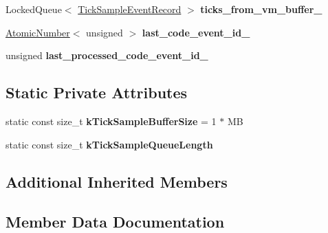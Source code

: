 \begin{DoxyCompactItemize}
\item 
Locked\+Queue$<$ \hyperlink{classv8_1_1internal_1_1_tick_sample_event_record}{Tick\+Sample\+Event\+Record} $>$ {\bfseries ticks\+\_\+from\+\_\+vm\+\_\+buffer\+\_\+}\hypertarget{classv8_1_1internal_1_1_profiler_events_processor_ab7618f01a46fb423db580f06e65baeb9}{}\label{classv8_1_1internal_1_1_profiler_events_processor_ab7618f01a46fb423db580f06e65baeb9}

\item 
\hyperlink{classv8_1_1internal_1_1_atomic_number}{Atomic\+Number}$<$ unsigned $>$ {\bfseries last\+\_\+code\+\_\+event\+\_\+id\+\_\+}\hypertarget{classv8_1_1internal_1_1_profiler_events_processor_a5006cc5f9e17cea97ca344e9b14715a1}{}\label{classv8_1_1internal_1_1_profiler_events_processor_a5006cc5f9e17cea97ca344e9b14715a1}

\item 
unsigned {\bfseries last\+\_\+processed\+\_\+code\+\_\+event\+\_\+id\+\_\+}\hypertarget{classv8_1_1internal_1_1_profiler_events_processor_aea0a102c5b542b8706b2a9076e07f824}{}\label{classv8_1_1internal_1_1_profiler_events_processor_aea0a102c5b542b8706b2a9076e07f824}

\end{DoxyCompactItemize}
\subsection*{Static Private Attributes}
\begin{DoxyCompactItemize}
\item 
static const size\+\_\+t {\bfseries k\+Tick\+Sample\+Buffer\+Size} = 1 $\ast$ MB\hypertarget{classv8_1_1internal_1_1_profiler_events_processor_adba9a2fee4d313343348a0c5ca2ca195}{}\label{classv8_1_1internal_1_1_profiler_events_processor_adba9a2fee4d313343348a0c5ca2ca195}

\item 
static const size\+\_\+t {\bfseries k\+Tick\+Sample\+Queue\+Length}
\end{DoxyCompactItemize}
\subsection*{Additional Inherited Members}


\subsection{Member Data Documentation}
